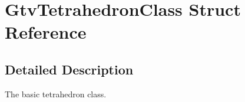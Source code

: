\section{GtvTetrahedronClass Struct Reference}
\label{structGtvTetrahedronClass}


\subsection{Detailed Description}
The basic tetrahedron class. 

